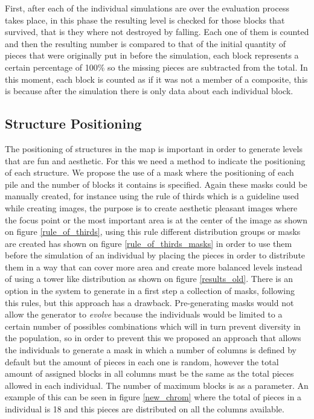 \documentclass[conference]{IEEEtran}
\begin{document}
    First, after each of the individual simulations are over the evaluation process
    takes place, in this phase the resulting level is checked for those blocks that
    survived, that is they where not destroyed by falling. Each one
    of them is counted and then the resulting number is compared to that of the
    initial quantity of pieces that were originally put in before the simulation,
    each block represents a certain percentage of 100\% so the missing pieces 
    are subtracted from the total. In this moment, each block is counted as if 
    it was not a member of a composite, this is because after the simulation there is
    only data about each individual block.

    \subsection{Structure Positioning}

     The positioning of structures in the map is important in order to generate
     levels that are fun and aesthetic. For this we need a method to indicate the
     positioning of each structure. We propose the use of a mask where the
     positioning of each pile and the number of blocks it contains is specified.
     Again these masks could be manually created, for instance using the rule of
     thirds \cite{DarrenRowse} which is a guideline used while creating images,
     the purpose is to create aesthetic pleasant images where the focus point
     or the most important area is at the center of the image as shown on figure
     \ref{rule_of_thirds}, using this rule different distribution groups or
     masks are created has shown on figure \ref{rule_of_thirds_masks} in order
     to use them before the simulation of an individual by placing the pieces in
     order to distribute them in a way that can cover more area and create more
     balanced levels instead of using a tower like distribution as shown on
     figure \ref{results_old}. There is an option in the system to generate in a
     first step a collection of masks, following this rules, but this approach
     has a drawback. Pre-generating masks would not allow the generator to
     \textit{evolve} because the individuals would be limited to a certain
     number of possibles combinations which will in turn prevent diversity in
     the population, so in order to prevent this we proposed an approach that
     allows the individuals to generate a mask in which a number of columns is
     defined by default but the amount of pieces in each one is random, however
     the total amount of assigned blocks in all columns must be the same as the
     total pieces allowed in each individual. The number of maximum blocks is as
     a parameter. An example of this can be seen in figure \ref{new_chrom} where
     the total of pieces in a individual is 18 and this pieces are distributed
     on all the columns available.
\end{document}
